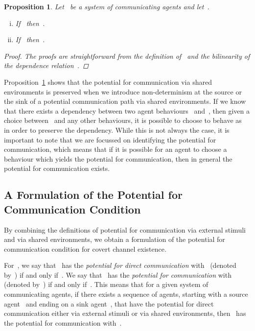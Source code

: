 \documentclass[copyright,creativecommons]{eptcs}
\makeatletter
\newcommand{\PFC}{potential for communication\@\xspace}
\newcommand{\PFCD}{potential for direct communication\@\xspace}
\newcommand{\soca}{system of communicating agents\@\xspace}
\newtheorem{proposition}{Proposition}
\makeatother
\begin{document}
\begin{proposition}
\label{prop:env_comm_plus}	
	Let~ be a \soca and let~.
	\begin{multicols}{2}
	\begin{enumerate}[(i)]
		\item \label{prop:env_comm_plus_sink}
			If~ then~.
		\item \label{prop:env_comm_plus_source}
			If~ then~.
	\end{enumerate}
	\end{multicols}

	\begin{proof}
		The proofs are straightforward from the definition of~ and the bilinearity of the dependence relation~.
	\end{proof}
\end{proposition}

Proposition~\ref{prop:env_comm_plus} shows that the \PFC via shared environments is preserved when we introduce non-determinism at the source or the sink of a potential communication path via shared environments. If we know that there exists a dependency between two agent behaviours~ and~, then given a choice between~ and any other behaviours, it is possible to choose to behave as~ in order to preserve the dependency. While this is not always the case, it is important to note that we are focussed on identifying the \PFC, which means that if it is possible for an agent to choose a behaviour which yields the \PFC, then in general the \PFC exists.



\vspace{-0.1in}
\subsection{A Formulation of the Potential for Communication Condition}
\label{sub:a_formulation_of_the_potential_for_communication_condition}


By combining the definitions of \PFC via external stimuli and via shared environments, we obtain a formulation of the \PFC condition for covert channel existence.

For~, we say that~ has the \emph{\PFCD} with~ (denoted by~) if and only if~. We say that~ has the \emph{\PFC} with~ (denoted by~) if and only if~. This means that for a given \soca, if there exists a sequence of agents, starting with a source agent~ and ending on a sink agent~, that have the \PFCD either via external stimuli or via shared environments, then~ has the \PFC with~. 
\end{document}
